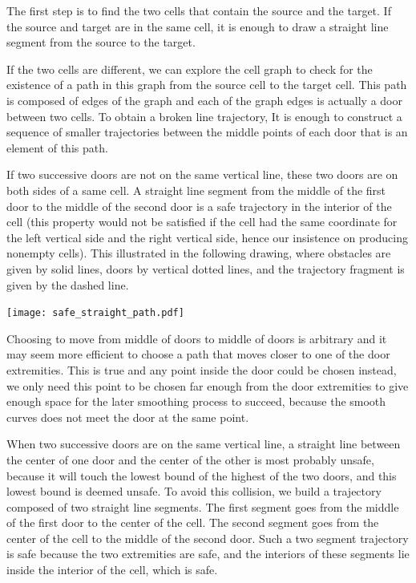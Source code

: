 \documentclass{llncs}
\begin{document}
The first step is to find the two cells that contain the source and
the target.  If the source and target are in the same cell, it is
enough to draw a straight line segment from the source to the target.

If the two cells are different, we can explore the cell graph to check for
the existence of a path in this graph from the source cell to the
target cell.  This path is composed of edges of the graph and each of
the graph edges is actually a door between two cells.  To obtain a
broken line trajectory, It is enough to
construct a sequence of smaller trajectories between the middle points
of each door that is an element of this path.

If two successive doors are not on the same
vertical line, these two doors are on both sides of a same cell.  A
straight line segment from the middle of the first door to the middle of
the second door is a safe trajectory in the interior of the cell (this
property would not be satisfied if the cell had the same coordinate
for the left vertical side and the right vertical side, hence our insistence
on producing nonempty cells).  This illustrated in the following drawing,
where obstacles are given by solid lines, doors by vertical dotted lines,
and the trajectory fragment is given by the dashed line.

\begin{center}
\texttt{[image: safe\_straight\_path.pdf]}
\end{center}

Choosing to move from middle of doors to middle of doors is arbitrary
and it may seem more efficient to choose a path that moves closer to
one of the door extremities.  This is true and any point inside the
door could be chosen instead, we only need this point to be chosen far
enough from the door extremities to give enough space for the later
smoothing process to succeed, because the smooth curves does not meet
the door at the same point.

When two successive doors are on the same vertical line, a straight
line between the center of one door and the center of the other is
most probably unsafe, because it will touch the lowest bound of the
highest of the two doors, and this lowest bound is deemed unsafe.
To avoid this collision, we build a trajectory composed of
two straight line segments.  The first segment goes from the middle of
the first door to the center of the cell.  The second segment goes
from the center of the cell to the middle of the second door.  Such a
two segment trajectory is safe because the two extremities are safe, and the
interiors of these segments lie inside the interior of the cell, which is
safe.
\end{document}
